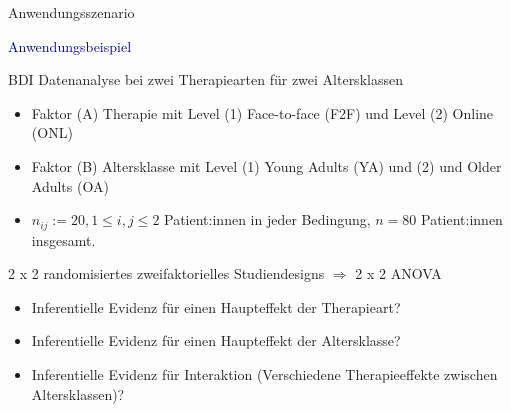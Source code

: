 \documentclass[
  8pt,
  ignorenonframetext,
]{beamer}
\providecommand{\tightlist}{%
  \setlength{\itemsep}{0pt}\setlength{\parskip}{0pt}}
\begin{document}
\begin{frame}{Anwendungsszenario}
\protect\hypertarget{anwendungsszenario-8}{}

\textcolor{darkblue}{Anwendungsbeispiel}

BDI Datenanalyse bei zwei Therapiearten für zwei Altersklassen

\small

\begin{itemize}
\tightlist
\item
  Faktor (A) Therapie mit Level (1) Face-to-face (F2F) und Level (2)
  Online (ONL)
\item
  Faktor (B) Altersklasse mit Level (1) Young Adults (YA) und (2) und
  Older Adults (OA)
\item
  \(n_{ij} := 20, 1 \le i,j \le 2\) Patient:innen in jeder Bedingung,
  \(n = 80\) Patient:innen insgesamt.
\end{itemize}

\normalsize

2 x 2 randomisiertes zweifaktorielles Studiendesigns \(\Rightarrow\) 2 x
2 ANOVA

\begin{itemize}
\tightlist
\item
  Inferentielle Evidenz für einen Haupteffekt der Therapieart?
\item
  Inferentielle Evidenz für einen Haupteffekt der Altersklasse?
\item
  Inferentielle Evidenz für Interaktion (Verschiedene Therapieeffekte
  zwischen Altersklassen)?
\end{itemize}
\end{frame}
\end{document}
